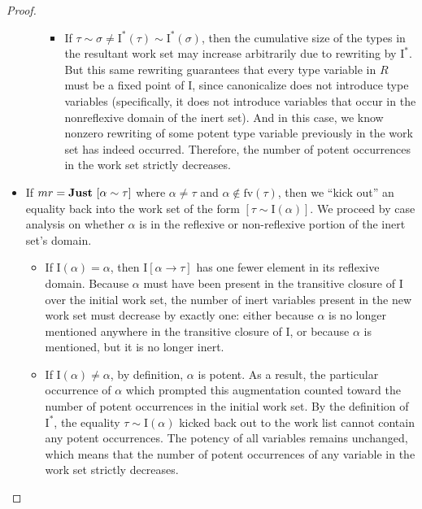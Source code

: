 \documentclass[10pt, letterpaper, oneside]{article}
\newcommand{\inertset}{\text{I}}
\newcommand{\fv}{\mathrm{fv}}
\begin{document}
\begin{proof}
\begin{itemize}
\begin{itemize}
\begin{itemize}
        \item If \(\tau \sim \sigma \ne \inertset^\ast(\tau) \sim \inertset^\ast(\sigma)\), then the cumulative size of the types in the resultant work set may increase arbitrarily due to rewriting by \(\inertset^\ast\). But this same rewriting guarantees that every type variable in \(R\) must be a fixed point of \(\inertset\), since canonicalize does not introduce type variables (specifically, it does not introduce variables that occur in the nonreflexive domain of the inert set). And in this case, we know nonzero rewriting of some potent type variable previously in the work set has indeed occurred. Therefore, the number of potent occurrences in the work set strictly decreases.

      \end{itemize}

    \end{itemize}

  \item If \(mr = \text{\bf Just}~[\alpha \sim \tau]\) where \(\alpha \ne \tau\) and \(\alpha \notin \fv(\tau)\), then we ``kick out'' an equality back into the work set of the form \([\tau \sim \inertset(\alpha)]\). We proceed by case analysis on whether \(\alpha\) is in the reflexive or non-reflexive portion of the inert set's domain.

    \begin{itemize}

      \item If \(\inertset(\alpha) = \alpha\), then \(\inertset[\alpha \to \tau]\) has one fewer element in its reflexive domain. Because \(\alpha\) must have been present in the transitive closure of \(\inertset\) over the initial work set, the number of inert variables present in the new work set must decrease by exactly one: either because \(\alpha\) is no longer mentioned anywhere in the transitive closure of \(\inertset\), or because \(\alpha\) is mentioned, but it is no longer inert.

      \item If \(\inertset(\alpha) \ne \alpha\), by definition, \(\alpha\) is potent. As a result, the particular occurrence of \(\alpha\) which prompted this augmentation counted toward the number of potent occurrences in the initial work set. By the definition of \(\inertset^\ast\), the equality \(\tau \sim \inertset(\alpha)\) kicked back out to the work list cannot contain any potent occurrences. The potency of all variables remains unchanged, which means that the number of potent occurrences of any variable in the work set strictly decreases.


\end{itemize}
\end{itemize}
\end{proof}
\end{document}
